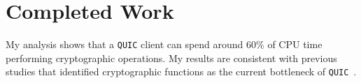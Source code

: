 \documentclass[12pt,a4paper]{report}
\begin{document}



\section{Completed Work}
My analysis shows that a \texttt{QUIC} client can spend around 60\% of CPU time performing cryptographic operations. 
My results are consistent with previous studies that identified cryptographic functions as the current bottleneck of \texttt{QUIC}~\cite{Making_QUIC_Quicker}.


















\end{document}
